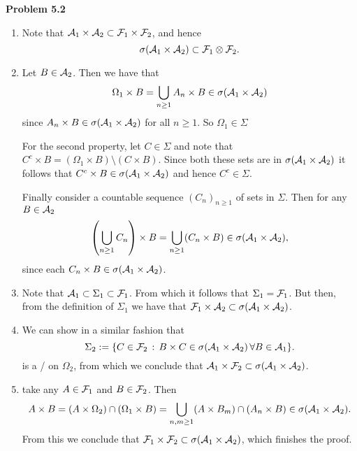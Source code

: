 \documentclass{lecturenotes}
\begin{document}
\textbf{Problem 5.2}
\begin{enumerate}[label={(\alph*)}]
\item Note that $\mathcal A_1 \times \mathcal A_2 \subset \mathcal F_1 \times \mathcal F_2$, and hence
\[
	\sigma(\mathcal A_1 \times \mathcal A_2) \subset \mathcal F_1 \otimes \mathcal F_2.
\]
\item Let $B \in \mathcal A_2$. Then we have that
\[
	\Omega_1 \times B = \bigcup_{n \ge 1} A_n \times B \in \sigma(\mathcal A_1 \times \mathcal A_2) 
\]
since $A_n \times B \in \sigma(\mathcal A_1 \times \mathcal A_2)$ for all $n \ge 1$. So $\Omega_1 \in \Sigma$

For the second property, let $C \in \Sigma$ and note that $C^c \times B = (\Omega_1 \times B) \setminus (C \times B)$.
Since both these sets are in $\sigma(\mathcal A_1 \times \mathcal A_2)$ it follows that $C^c \times B \in \sigma(\mathcal A_1 \times \mathcal A_2)$ and hence $C^c \in \Sigma$.

Finally consider a countable sequence $(C_n)_{n \ge 1}$ of sets in $\Sigma$. Then for any $B \in \mathcal A_2$
\[
	\left(\bigcup_{n \ge 1} C_n \right) \times B = \bigcup_{n \ge 1} (C_n \times B) \in \sigma(\mathcal A_1 \times \mathcal A_2),
\]
since each $C_n \times B \in \sigma(\mathcal A_1 \times \mathcal A_2)$.
\item Note that $\mathcal A_1 \subset \Sigma_1 \subset \mathcal F_1$. From which it follows that $\Sigma_1 = \mathcal F_1$. But then, from the definition of $\Sigma_1$ we have that $\mathcal F_1 \times \mathcal A_2 \subset \sigma(\mathcal A_1 \times \mathcal A_2)$.
\item We can show in a similar fashion that
\[
	\Sigma_2 := \{C \in \mathcal F_2 \, : \, B \times C \in \sigma(\mathcal A_1 \times \mathcal A_2) \, \forall B \in \mathcal A_1\}.
\]
is a \sigalg/ on $\Omega_2$, from which we conclude that $\mathcal A_1 \times \mathcal F_2 \subset \sigma(\mathcal A_1 \times \mathcal A_2)$.
\item take any $A \in \mathcal F_1$ and $B \in \mathcal F_2$. Then
\[
	A \times B = (A \times \Omega_2) \cap (\Omega_1 \times B) = \bigcup_{n,m \ge 1} (A \times B_m) \cap (A_n \times B) \in \sigma(\mathcal A_1 \times \mathcal A_2).
\]
From this we conclude that $\mathcal F_1 \times \mathcal F_2 \subset \sigma(\mathcal A_1 \times \mathcal A_2)$, which finishes the proof.
\end{enumerate}
\end{document}
